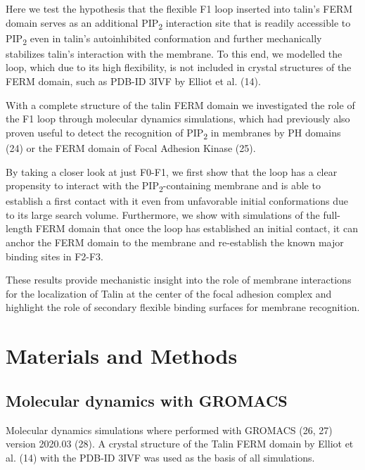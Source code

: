 \documentclass[
  letterpaper,
  DIV=11,
  numbers=noendperiod]{scrartcl}
\begin{document}
Here we test the hypothesis that the flexible F1 loop inserted into
talin's FERM domain serves as an additional PIP\textsubscript{2}
interaction site that is readily accessible to PIP\textsubscript{2} even
in talin's autoinhibited conformation and further mechanically
stabilizes talin's interaction with the membrane. To this end, we
modelled the loop, which due to its high flexibility, is not included in
crystal structures of the FERM domain, such as PDB-ID 3IVF by Elliot et
al. (14).

With a complete structure of the talin FERM domain we investigated the
role of the F1 loop through molecular dynamics simulations, which had
previously also proven useful to detect the recognition of
PIP\textsubscript{2} in membranes by PH domains (24) or the FERM domain
of Focal Adhesion Kinase (25).

By taking a closer look at just F0-F1, we first show that the loop has a
clear propensity to interact with the PIP\textsubscript{2}-containing
membrane and is able to establish a first contact with it even from
unfavorable initial conformations due to its large search volume.
Furthermore, we show with simulations of the full-length FERM domain
that once the loop has established an initial contact, it can anchor the
FERM domain to the membrane and re-establish the known major binding
sites in F2-F3.

These results provide mechanistic insight into the role of membrane
interactions for the localization of Talin at the center of the focal
adhesion complex and highlight the role of secondary flexible binding
surfaces for membrane recognition.

\hypertarget{materials-and-methods}{%
\section{Materials and Methods}\label{materials-and-methods}}

\hypertarget{molecular-dynamics-with-gromacs}{%
\subsection{Molecular dynamics with
GROMACS}\label{molecular-dynamics-with-gromacs}}

Molecular dynamics simulations where performed with GROMACS (26, 27)
version 2020.03 (28). A crystal structure of the Talin FERM domain by
Elliot et al. (14) with the PDB-ID 3IVF was used as the basis of all
simulations.
\end{document}
